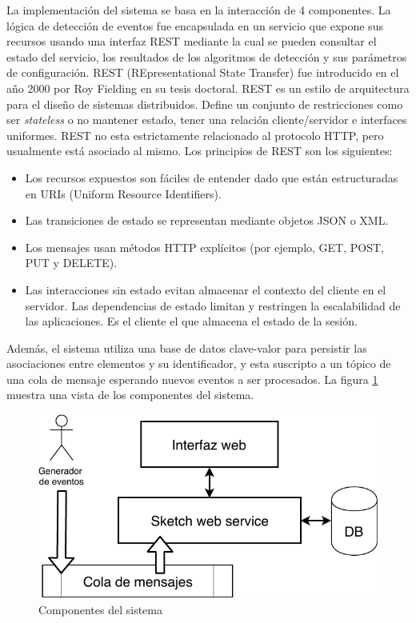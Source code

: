 \documentclass[a4paper,10pt, oneside]{article}
\begin{document}
La implementación del sistema se basa en la interacción de 4 componentes. La lógica de detección de eventos fue encapsulada en un servicio que expone sus recursos usando una interfaz REST mediante la cual se pueden consultar el estado del servicio, los resultados de los algoritmos de detección y sus parámetros de configuración. 
REST (REpresentational State Transfer) fue introducido en el año 2000 por Roy Fielding en su tesis doctoral\cite{Fielding:2000:ASD:932295}. REST es un estilo de arquitectura para el diseño de sistemas distribuidos. Define un conjunto de restricciones como ser \textit{stateless} o no mantener estado, tener una relación cliente/servidor e interfaces uniformes. REST no esta estrictamente relacionado al protocolo HTTP, pero usualmente está asociado al mismo. Los principios de REST son los siguientes:

\begin{itemize}
	\item Los recursos expuestos son fáciles de entender dado que están estructuradas en URIs (Uniform Resource Identifiers).
	\item Las transiciones de estado se representan mediante objetos JSON o XML.
	\item Los mensajes usan métodos HTTP explícitos (por ejemplo, GET, POST, PUT y DELETE).
	\item Las interacciones sin estado evitan almacenar el contexto del cliente en el servidor. Las dependencias de estado limitan y restringen la escalabilidad de las aplicaciones. Es el cliente el que almacena el estado de la sesión.
\end{itemize}

Además, el sistema utiliza una base de datos clave-valor para persistir las asociaciones entre elementos y su identificador, y esta suscripto a un tópico de una cola de mensaje esperando nuevos eventos a ser procesados. La figura \ref{fig:system_components_overview} muestra una vista de los componentes del sistema.

\begin{figure}[htp]
	\centering
	\includegraphics[width=.6\textwidth]{./graph/system_components_overview.pdf}
	\caption{Componentes del sistema}
	\label{fig:system_components_overview}
	\medskip
	\small
\end{figure}
\end{document}
